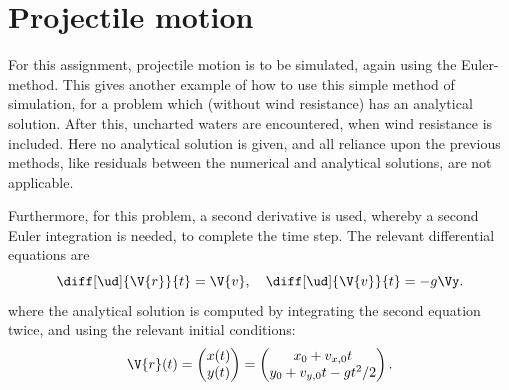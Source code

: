 \documentclass[a4paper,10pt]{article} 	%
\numberwithin{equation}{section}
\begin{document}
	
	\section{Projectile motion}
	For this assignment, projectile motion is to be simulated, again using the Euler-method. This gives another example of how to use this simple method of simulation, for a problem which (without wind resistance) has an analytical solution. After this, uncharted waters are encountered, when wind resistance is included. Here no analytical solution is given, and all reliance upon the previous methods, like residuals between the numerical and analytical solutions, are not applicable.
	
	Furthermore, for this problem, a second derivative is used, whereby a second Euler integration is needed, to complete the time step. The relevant differential equations are
	\begin{equation}\label{key}
		\diff[\ud]{\V{r}}{t} = \V{v}, \quad \diff[\ud]{\V{v}}{t} = -g\Vy.
	\end{equation}
	where the analytical solution is computed by integrating the second equation twice, and using the relevant initial conditions:
	\begin{equation}\label{key}
		\V{r}(t) = \begin{pmatrix}
		x(t) \\ y(t)
		\end{pmatrix} = \begin{pmatrix}
		x_0+v_{x,0} t \\ y_0+v_{y,0}t-gt^2/2
		\end{pmatrix}. 
	\end{equation}
	
	
\end{document}
